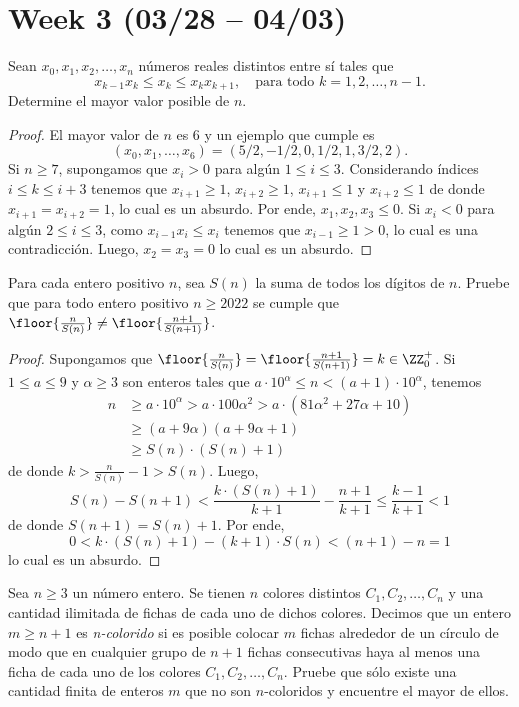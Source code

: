 \section{Week 3 (03/28 -- 04/03)}

\begin{probEG}
	Sean $x_0,x_1,x_2,\dots,x_n$ números reales distintos entre sí tales que
	\[x_{k-1}x_k\le x_k\le x_kx_{k+1},\quad\text{para todo }k=1,2,\dots,n-1.\]
	Determine el mayor valor posible de $n$.
\end{probEG}

\begin{proof}
	El mayor valor de $n$ es $6$ y un ejemplo que cumple es
	\[(x_0,x_1,\dots,x_6)=(5/2,-1/2,0,1/2,1,3/2,2).\]
	Si $n\ge 7$, supongamos que $x_i>0$ para algún $1\le i\le 3$. Considerando índices $i\le k\le i+3$ tenemos que $x_{i+1}\ge 1$, $x_{i+2}\ge 1$, $x_{i+1}\le 1$ y $x_{i+2}\le 1$ de donde $x_{i+1}=x_{i+2}=1$, lo cual es un absurdo. Por ende, $x_1,x_2,x_3\le 0$. Si $x_i<0$ para algún $2\le i\le 3$, como $x_{i-1}x_i\le x_i$ tenemos que $x_{i-1}\ge 1>0$, lo cual es una contradicción. Luego, $x_2=x_3=0$ lo cual es un absurdo.
\end{proof}

\begin{probEG}
	Para cada entero positivo $n$, sea $S(n)$ la suma de todos los dígitos de $n$. Pruebe que para todo entero positivo $n\ge 2022$ se cumple que $\floor{\frac{n}{S(n)}}\ne\floor{\frac{n+1}{S(n+1)}}$.
\end{probEG}

\begin{proof}
	Supongamos que $\floor{\frac{n}{S(n)}}=\floor{\frac{n+1}{S(n+1)}}=k\in\ZZ^+_0$. Si $1\le a\le 9$ y $\alpha\ge 3$ son enteros tales que $a\cdot 10^\alpha\le n<(a+1)\cdot 10^\alpha$, tenemos
	\begin{align*}
		n
		&\ge a\cdot 10^\alpha>a\cdot 100\alpha^2>a\cdot(81\alpha^2+27\alpha+10) \\
		&\ge (a+9\alpha)(a+9\alpha+1) \\
		&\ge S(n)\cdot(S(n)+1)
	\end{align*} 
	de donde $k>\frac{n}{S(n)}-1>S(n)$. Luego,
	\[S(n)-S(n+1)<\frac{k\cdot (S(n)+1)}{k+1}-\frac{n+1}{k+1}\le\frac{k-1}{k+1}<1\]
	de donde $S(n+1)=S(n)+1$. Por ende,
	\[0<k\cdot(S(n)+1)-(k+1)\cdot S(n)<(n+1)-n=1\]
	lo cual es un absurdo.
\end{proof}

\begin{probEG}
	Sea $n\ge 3$ un número entero. Se tienen $n$ colores distintos $C_1,C_2,\dots,C_n$ y una cantidad ilimitada de fichas de cada uno de dichos colores. Decimos que un entero $m\ge n+1$ es \emph{n-colorido} si es posible colocar $m$ fichas alrededor de un círculo de modo que en cualquier grupo de $n+1$ fichas consecutivas haya al menos una ficha de cada uno de los colores $C_1,C_2,\dots,C_n$. Pruebe que sólo existe una cantidad finita de enteros $m$ que no son $n$-coloridos y encuentre el mayor de ellos.
\end{probEG}

